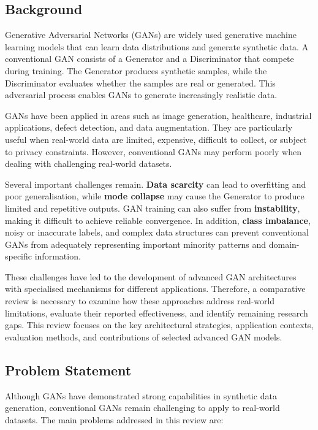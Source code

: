 \documentclass[12pt,a4paper]{article}
\begin{document}
\subsection{Background}

Generative Adversarial Networks (GANs) are widely used generative machine learning models that can learn data distributions and generate synthetic data. A conventional GAN consists of a Generator and a Discriminator that compete during training. The Generator produces synthetic samples, while the Discriminator evaluates whether the samples are real or generated. This adversarial process enables GANs to generate increasingly realistic data.

GANs have been applied in areas such as image generation, healthcare, industrial applications, defect detection, and data augmentation. They are particularly useful when real-world data are limited, expensive, difficult to collect, or subject to privacy constraints. However, conventional GANs may perform poorly when dealing with challenging real-world datasets.

Several important challenges remain. \textbf{Data scarcity} can lead to overfitting and poor generalisation, while \textbf{mode collapse} may cause the Generator to produce limited and repetitive outputs. GAN training can also suffer from \textbf{instability}, making it difficult to achieve reliable convergence. In addition, \textbf{class imbalance}, noisy or inaccurate labels, and complex data structures can prevent conventional GANs from adequately representing important minority patterns and domain-specific information.

These challenges have led to the development of advanced GAN architectures with specialised mechanisms for different applications. Therefore, a comparative review is necessary to examine how these approaches address real-world limitations, evaluate their reported effectiveness, and identify remaining research gaps. This review focuses on the key architectural strategies, application contexts, evaluation methods, and contributions of selected advanced GAN models.


\subsection{Problem Statement}

Although GANs have demonstrated strong capabilities in synthetic data generation, conventional GANs remain challenging to apply to real-world datasets. The main problems addressed in this review are: 
\end{document}
